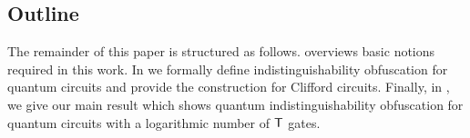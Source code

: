 %
%
%

%
\subsection*{Outline}
The remainder of this paper is structured as follows.  overviews basic notions required in this work. In  we formally define indistinguishability obfuscation for quantum circuits and provide the construction for Clifford circuits. Finally, in , we give our main result which shows quantum indistinguishability obfuscation for quantum circuits with a logarithmic number of ${\sf T}$ gates. 